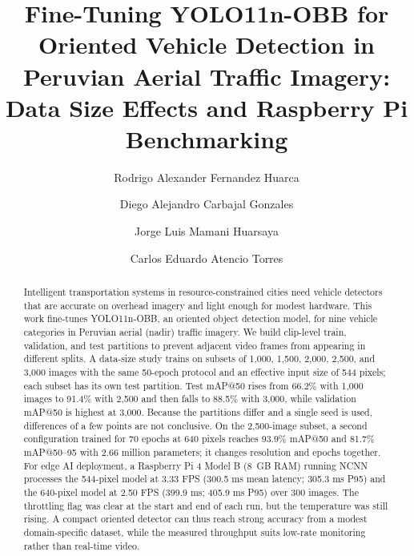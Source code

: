 \documentclass[runningheads]{llncs}
\begin{document}
\title{Fine-Tuning YOLO11n-OBB for Oriented Vehicle Detection in Peruvian Aerial Traffic Imagery: Data Size Effects and Raspberry Pi Benchmarking}

\author{Rodrigo Alexander Fernandez Huarca \and
Diego Alejandro Carbajal Gonzales \and
Jorge Luis Mamani Huarsaya \and
Carlos Eduardo Atencio Torres}

\maketitle

\begin{abstract}
Intelligent transportation systems in resource-constrained cities need
vehicle detectors that are accurate on overhead imagery and light enough for
modest hardware. This work fine-tunes YOLO11n-OBB, an oriented object detection
model, for nine vehicle categories in Peruvian aerial (nadir) traffic imagery.
We build clip-level train, validation, and test partitions to prevent adjacent
video frames from appearing in different splits. A data-size study trains on
subsets of 1,000, 1,500, 2,000, 2,500, and 3,000 images with the same 50-epoch
protocol and an effective input size of 544 pixels; each subset has its own test
partition. Test mAP@50 rises from 66.2\% with 1,000 images to 91.4\% with 2,500
and then falls to 88.5\% with 3,000, while validation mAP@50 is highest at 3,000.
Because the partitions differ and a single seed is used, differences of a few
points are not conclusive. On the 2,500-image subset, a second
configuration trained for 70 epochs at 640 pixels reaches 93.9\% mAP@50 and
81.7\% mAP@50--95 with 2.66 million parameters; it changes resolution and
epochs together. For edge AI deployment, a Raspberry Pi 4 Model B (8~GB RAM)
running NCNN processes the 544-pixel model at 3.33 FPS (300.5 ms mean latency;
305.3 ms P95) and the 640-pixel model at 2.50 FPS (399.9 ms; 405.9 ms P95) over
300 images. The throttling flag was clear at the start and end of each run, but
the temperature was still rising. A compact oriented detector can thus reach
strong accuracy from a modest domain-specific dataset, while the measured
throughput suits low-rate monitoring rather than real-time video.

\end{abstract}
\end{document}
